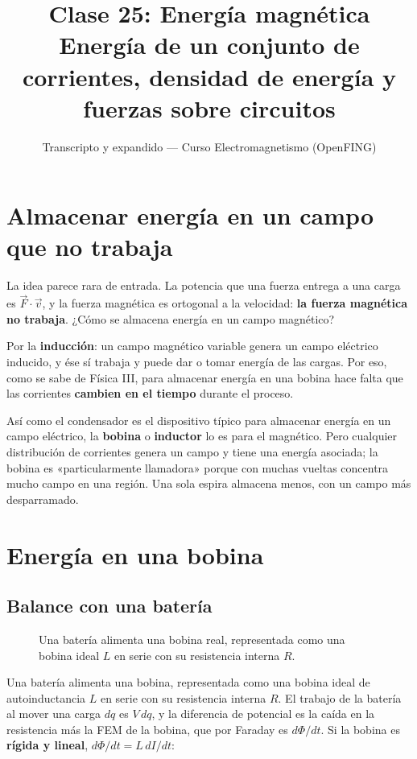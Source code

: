 \documentclass[12pt,a4paper]{article}
\title{\textbf{Clase 25: Energía magnética} \\[0.3em]
        \large{Energía de un conjunto de corrientes, densidad de energía y fuerzas sobre circuitos}}
\author{Transcripto y expandido --- Curso Electromagnetismo (OpenFING)}
\date{}
\begin{document}
\maketitle
\thispagestyle{empty}
\newpage

\tableofcontents
\newpage

\section{Almacenar energía en un campo que no trabaja}

La idea parece rara de entrada. La potencia que una fuerza entrega a una carga
es $\vec F\cdot\vec v$, y la fuerza magnética es ortogonal a la velocidad: \textbf{la
fuerza magnética no trabaja}. ¿Cómo se almacena energía en un campo magnético?

Por la \textbf{inducción}: un campo magnético variable genera un campo eléctrico
inducido, y ése sí trabaja y puede dar o tomar energía de las cargas. Por eso,
como se sabe de Física III, para almacenar energía en una bobina hace falta que
las corrientes \textbf{cambien en el tiempo} durante el proceso.

Así como el condensador es el dispositivo típico para almacenar energía en un
campo eléctrico, la \textbf{bobina} o \textbf{inductor} lo es para el magnético. Pero
cualquier distribución de corrientes genera un campo y tiene una energía
asociada; la bobina es «particularmente llamadora» porque con muchas vueltas
concentra mucho campo en una región. Una sola espira almacena menos, con un
campo más desparramado.

\section{Energía en una bobina}

\subsection{Balance con una batería}

\begin{figure}[H]
  \centering
  
  \caption{Una batería alimenta una bobina real, representada como una bobina ideal $L$ en serie con su resistencia interna $R$.}
\end{figure}

Una batería alimenta una bobina, representada como una bobina ideal de
autoinductancia $L$ en serie con su resistencia interna $R$. El trabajo de la
batería al mover una carga $dq$ es $V\,dq$, y la diferencia de potencial es la
caída en la resistencia más la FEM de la bobina, que por Faraday es
$d\Phi/dt$. Si la bobina es \textbf{rígida y lineal}, $d\Phi/dt = L\,dI/dt$:
\end{document}
